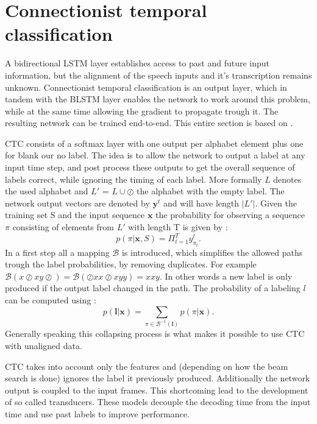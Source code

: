 \section{Connectionist temporal classification}
A bidirectional LSTM layer establishes access to past and future input information, but the alignment of the speech inputs and it's transcription remains unknown. Connectionist temporal classification is an output layer, which in tandem with the BLSTM layer enables the network to work around this problem, while at the same time allowing the gradient to propagate trough it. The resulting network can be trained end-to-end. This entire section is based on \cite[chapter 7]{Graves2008}.

CTC consists of a softmax layer with one output per alphabet element plus one for blank our no label. The idea is to allow the network to output a label at any input time step, and post process these outputs to get the overall sequence of labels correct, while ignoring the timing of each label. 
More formally $L$ denotes the used alphabet and $L'$ = $L \cup \oslash $ the alphabet with the empty label. The network output vectors are denoted by $\mathbf{y}^t$ and will have length $|L'|$. Given the training set S and the input sequence $\mathbf{x}$ the probability for observing a sequence $\pi$ consisting of elements from $L'$ with length T is given by \cite[page 56]{Graves2008}:
\begin{equation}
p(\pi| \mathbf{x}, S) = \Pi_{t=1}^T y^t_{\pi_t}.
\end{equation}
In a first step all a mapping $\mathcal{B}$ is introduced, which simplifies the allowed paths trough the label probabilities, by removing duplicates. For example $\mathcal{B}(x \oslash xy \oslash) = \mathcal{B}(\oslash x x \oslash xyy) = xxy$. In other words a new label is only produced if the output label changed in the path. The probability of a labeling $l$ can be computed using \cite[page 57]{Graves2008}:
\begin{equation}
p(\mathbf{l|\mathbf{x}}) = \sum\limits_{\pi \in \mathcal{B}^{-1}(\mathbf{l})}p(\pi|\mathbf{x}).
\end{equation} 
Generally speaking this collapsing process is what makes it possible to use CTC with unaligned data. 


CTC takes into account only the features and (depending on how the beam search is done) ignores the label it previously produced. Additionally the network output is coupled to the input frames. This shortcoming lead to the development of so called transducers. These models decouple the decoding time from the input time and use past labels to improve performance.



